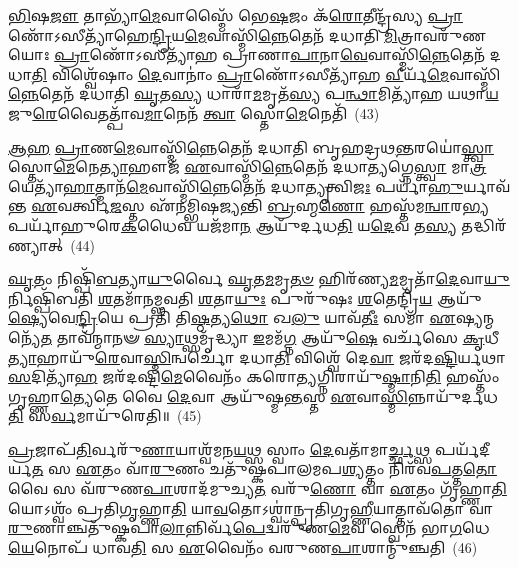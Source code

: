 \-\ul{𑌭𑌿}\-𑌷\-\ul{𑌜𑍗} 𑌤𑌾𑌭𑍍𑌯𑌾᳴\-\ul{𑌮𑍇}\-𑌵𑌾𑌸𑍍𑌮𑍈᳴ 𑌭𑍇\-\ul{𑌷}\-𑌜𑌂 𑌕᳴\-\ul{𑌰𑍋}\-𑌤𑍀𑌨𑍍𑌦𑍍𑌰᳴𑌸𑍍𑌯 \ul{𑌪𑍍𑌰𑌾}\-𑌣𑍋᳴\-𑌽𑌸𑍀𑌤𑍍𑌯𑌾᳴𑌹𑍇\-\ul{𑌨𑍍𑌦𑍍𑌰𑌿}\-𑌯\-\ul{𑌮𑍇}\-𑌵𑌾𑌸𑍍𑌮𑌿᳴\-\ul{𑌨𑍍𑌨𑍇}\-𑌤𑍇𑌨᳴ 𑌦𑌧𑌾𑌤𑌿 \ul{𑌮𑌿}\-𑌤𑍍𑌰𑌾𑌵𑌰𑍁᳴𑌣𑌯𑍋𑌃 \ul{𑌪𑍍𑌰𑌾}\-𑌣𑍋᳴\-𑌽𑌸𑍀𑌤𑍍𑌯𑌾᳴𑌹 𑌪𑍍𑌰𑌾𑌣𑌾\-\ul{𑌪𑌾}\-𑌨𑌾\-\ul{𑌵𑍇}\-𑌵𑌾𑌸𑍍𑌮𑌿᳴\-\ul{𑌨𑍍𑌨𑍇}\-𑌤𑍇𑌨᳴ 𑌦𑌧𑌾\-\ul{𑌤𑌿} 𑌵𑌿𑌶𑍍𑌵𑍇᳴𑌷𑌾𑌂 \ul{𑌦𑍇}\-𑌵𑌾𑌨𑌾𑌂॑ \ul{𑌪𑍍𑌰𑌾}\-𑌣𑍋᳴\-𑌽𑌸𑍀𑌤𑍍𑌯𑌾᳴𑌹 \ul{𑌵𑍀}\-𑌰𑍍𑌯᳴\-\ul{𑌮𑍇}\-𑌵𑌾𑌸𑍍𑌮𑌿᳴\-\ul{𑌨𑍍𑌨𑍇}\-𑌤𑍇𑌨᳴ 𑌦𑌧𑌾𑌤𑌿 \ul{𑌘𑍃}\-𑌤\-\ul{𑌸𑍍𑌯} 𑌧𑌾𑌰𑌾᳴\-\ul{𑌮}\-𑌮𑍃𑌤᳴\-\ul{𑌸𑍍𑌯} 𑌪\-\ul{𑌨𑍍𑌥𑌾}\-𑌮𑌿𑌤𑍍𑌯𑌾᳴𑌹 𑌯𑌥𑌾\-\ul{𑌯}\-𑌜𑍁\-\ul{𑌰𑍇}\-𑌵𑍈𑌤𑌤𑍍𑌪𑌾᳴𑌵\-\ul{𑌮𑌾}\-𑌨𑍇𑌨᳴ \ul{𑌤𑍍𑌵𑌾} 𑌸𑍍𑌤𑍋\-\ul{𑌮𑍇}\-𑌨𑍇𑌤𑌿᳴~(43)

\-\ul{𑌆}\-\-\ul{𑌹} \ul{𑌪𑍍𑌰𑌾}\-𑌣\-\ul{𑌮𑍇}\-𑌵𑌾𑌸𑍍𑌮𑌿᳴\-\ul{𑌨𑍍𑌨𑍇}\-𑌤𑍇𑌨᳴ 𑌦𑌧𑌾𑌤𑌿 𑌬𑍃𑌹𑌦𑍍𑌰𑌥\-\ul{𑌨𑍍𑌤}\-𑌰𑌯𑍋॑\-\ul{𑌸𑍍𑌤𑍍𑌵𑌾} 𑌸𑍍𑌤𑍋\-\ul{𑌮𑍇}\-𑌨𑍇\-\ul{𑌤𑍍𑌯𑌾}\-𑌹𑍗𑌜᳴ \ul{𑌏}\-𑌵𑌾𑌸𑍍𑌮𑌿᳴\-\ul{𑌨𑍍𑌨𑍇}\-𑌤𑍇𑌨᳴ 𑌦𑌧𑌾\-\ul{𑌤𑍍𑌯}\-𑌗𑍍𑌨𑍇\-\ul{𑌸𑍍𑌤𑍍𑌵𑌾} 𑌮𑌾\-\ul{𑌤𑍍𑌰}\-𑌯𑍇𑌤𑍍𑌯𑌾᳴\-\ul{𑌹𑌾}\-𑌤𑍍𑌮𑌾𑌨᳴\-\ul{𑌮𑍇}\-𑌵𑌾𑌸𑍍𑌮𑌿᳴\-\ul{𑌨𑍍𑌨𑍇}\-𑌤𑍇𑌨᳴ 𑌦𑌧𑌾\-\ul{𑌤𑍍𑌯𑍃}\-𑌤𑍍𑌵𑌿\-\ul{𑌜𑌃} 𑌪𑌰𑍍𑌯𑌾᳴\-\ul{𑌹𑍁}\-𑌰𑍍𑌯𑌾𑌵᳴𑌨𑍍𑌤 \ul{𑌏}\-𑌵𑌰𑍍𑌤𑍍𑌵𑌿\-\ul{𑌜}\-𑌸𑍍𑌤 𑌏᳴𑌨𑌮𑍍𑌭𑌿𑌷𑌜𑍍𑌯𑌨𑍍𑌤𑌿 \ul{𑌬𑍍𑌰}\-𑌹𑍍𑌮\-\ul{𑌣𑍋} 𑌹𑌸𑍍𑌤᳴𑌮\-\ul{𑌨𑍍𑌵𑌾}\-𑌰\-\ul{𑌭𑍍𑌯} 𑌪𑌰𑍍𑌯𑌾᳴𑌹𑍁𑌰𑍇\-\ul{𑌕}\-𑌧𑍈𑌵 𑌯𑌜᳴𑌮𑌾\-\ul{𑌨} 𑌆𑌯𑍁᳴𑌰𑍍𑌦𑌧\-\ul{𑌤𑌿} 𑌯\-\ul{𑌦𑍇}\-𑌵 𑌤\-\ul{𑌸𑍍𑌯} 𑌤𑌦𑍍𑌧𑌿𑌰᳴𑌣𑍍𑌯𑌾𑌤𑍍~(44)

\-\ul{𑌘𑍃}\-𑌤𑌂 𑌨𑌿𑌷𑍍𑌪𑌿᳴\-\ul{𑌬}\-𑌤𑍍𑌯𑌾\-\ul{𑌯𑍁}\-𑌰𑍍𑌵𑍈 \ul{𑌘𑍃}\-𑌤\-\ul{𑌮}\-𑌮𑍃\-\ul{𑌤}\-\-\ul{𑍞} 𑌹𑌿𑌰᳴𑌣𑍍𑌯\-\ul{𑌮}\-𑌮𑍃𑌤𑌾᳴\-\ul{𑌦𑍇}\-𑌵𑌾\-\ul{𑌯𑍁}\-𑌰𑍍𑌨𑌿𑌷𑍍𑌪𑌿᳴𑌬𑌤𑌿 \ul{𑌶}\-𑌤𑌮𑌾᳴𑌨𑌮𑍍𑌭𑌵𑌤𑌿 \ul{𑌶}\-𑌤𑌾\-\ul{𑌯𑍁𑌃} 𑌪𑍁𑌰𑍁᳴𑌷𑌃 \ul{𑌶}\-𑌤𑍇𑌨𑍍𑌦𑍍𑌰𑌿᳴\-\ul{𑌯} 𑌆𑌯𑍁᳴\-\ul{𑌷𑍍𑌯𑍇}\-𑌵𑍇\-\ul{𑌨𑍍𑌦𑍍𑌰𑌿}\-𑌯𑍇 𑌪𑍍𑌰𑌤𑌿᳴ 𑌤𑌿\-\ul{𑌷𑍍𑌠}\-𑌤𑍍𑌯\-\ul{𑌥𑍋} 𑌖\-\ul{𑌲𑍁} 𑌯𑌾𑌵᳴\-\ul{𑌤𑍀𑌃} 𑌸𑌮𑌾᳴ \ul{𑌏}\-𑌷𑍍𑌯𑌨𑍍𑌮𑌨𑍍𑌯𑍇᳴\-\ul{𑌤} 𑌤𑌾𑌵᳴𑌨𑍍𑌮𑌾𑌨𑍟 \ul{𑌸𑍍𑌯𑌾}\-𑌥𑍍𑌸𑌮𑍃᳴𑌦𑍍𑌧𑍍𑌯𑌾 \ul{𑌇}\-𑌮𑌮᳴\-\ul{𑌗𑍍𑌨} 𑌆𑌯𑍁᳴\-\ul{𑌷𑍇} 𑌵𑌰𑍍𑌚᳴𑌸𑍇 \ul{𑌕𑍃}\-𑌧𑍀\-\ul{𑌤𑍍𑌯𑌾}\-𑌹𑌾𑌯𑍁᳴\-\ul{𑌰𑍇}\-𑌵𑌾\-\ul{𑌸𑍍𑌮𑌿}\-𑌨𑍍𑌵𑌰𑍍𑌚𑍋᳴ 𑌦𑌧𑌾\-\ul{𑌤𑌿} 𑌵𑌿𑌶𑍍𑌵𑍇᳴ 𑌦𑍇\-\ul{𑌵𑌾} 𑌜𑌰᳴𑌦\-\ul{𑌷𑍍𑌟𑌿}\-𑌰𑍍𑌯𑌥𑌾\-\ul{𑌸}\-𑌦𑌿𑌤𑍍𑌯𑌾᳴\-\ul{𑌹} 𑌜𑌰᳴𑌦𑌷𑍍𑌟𑌿\-\ul{𑌮𑍇}\-𑌵𑍈𑌨𑌂᳴ 𑌕𑌰𑍋\-\ul{𑌤𑍍𑌯}\-𑌗𑍍𑌨𑌿𑌰𑌾𑌯𑍁᳴\-\ul{𑌷𑍍𑌮𑌾}\-𑌨𑌿\-\ul{𑌤𑌿} 𑌹𑌸𑍍𑌤𑌂᳴ 𑌗𑍃𑌹𑍍𑌣𑌾\-\ul{𑌤𑍍𑌯𑍇}\-𑌤𑍇 𑌵𑍈 \ul{𑌦𑍇}\-𑌵𑌾 𑌆𑌯𑍁᳴𑌷𑍍𑌮\-\ul{𑌨𑍍𑌤}\-𑌸𑍍𑌤 \ul{𑌏}\-𑌵𑌾\-\ul{𑌸𑍍𑌮𑌿}\-𑌨𑍍𑌨𑌾𑌯𑍁᳴𑌰𑍍𑌦𑌧\-\ul{𑌤𑌿} 𑌸\-\ul{𑌰𑍍𑌵}\-𑌮𑌾𑌯𑍁᳴𑌰𑍇𑌤𑌿॥~(45)

{\anuvakamend[{𑌰𑌸𑌂᳴ \ul{𑌦𑍇}\-𑌵𑌾\-\ul{𑌨𑌾}\-\-\ul{𑍟} 𑌸𑍍𑌤𑍋\-\ul{𑌮𑍇}\-𑌨𑍇\-\ul{𑌤𑌿} 𑌹𑌿𑌰᳴\-\ul{𑌣𑍍𑌯𑌾}\-𑌦\-\ul{𑌸}\-𑌦𑌿\-\ul{𑌤𑌿} 𑌦𑍍𑌵𑌾𑌵𑌿𑍞᳴𑌶𑌤𑌿𑌶𑍍𑌚}]}%

\-\ul{𑌪𑍍𑌰}\-𑌜𑌾𑌪᳴\-\ul{𑌤𑌿}\-𑌰𑍍𑌵𑌰𑍁᳴\-\ul{𑌣𑌾}\-𑌯𑌾𑌶𑍍𑌵᳴𑌮𑌨\-\ul{𑌯}\-𑌥𑍍𑌸 𑌸𑍍𑌵𑌾𑌂 \ul{𑌦𑍇}\-𑌵𑌤𑌾᳴𑌮𑌾\-\ul{𑌰𑍍𑌚𑍍𑌛}\-𑌥𑍍𑌸 𑌪𑌰𑍍𑌯᳴𑌦𑍀𑌰𑍍𑌯\-\ul{𑌤} 𑌸 \ul{𑌏}\-𑌤𑌂 𑌵𑌾᳴\-\ul{𑌰𑍁}\-𑌣𑌂 𑌚𑌤𑍁᳴𑌷𑍍𑌕𑌪𑌾𑌲𑌮𑌪\-\ul{𑌶𑍍𑌯}\-𑌤𑍍𑌤𑌂 𑌨𑌿𑌰᳴𑌵\-\ul{𑌪}\-𑌤𑍍𑌤\-\ul{𑌤𑍋} 𑌵𑍈 𑌸 𑌵᳴𑌰𑍁𑌣\-\ul{𑌪𑌾}\-𑌶𑌾𑌦᳴𑌮𑍁𑌚𑍍𑌯\-\ul{𑌤} 𑌵𑌰𑍁᳴\-\ul{𑌣𑍋} 𑌵𑌾 \ul{𑌏}\-𑌤𑌂 𑌗𑍃᳴𑌹𑍍𑌣𑌾\-\ul{𑌤𑌿} 𑌯𑍋\-𑌽𑌶𑍍𑌵𑌂᳴ 𑌪𑍍𑌰𑌤𑌿\-\ul{𑌗𑍃}\-𑌹𑍍𑌣𑌾\-\ul{𑌤𑌿} 𑌯𑌾\-\ul{𑌵}\-𑌤𑍋\-𑌽𑌶𑍍𑌵𑌾॑𑌨𑍍𑌪𑍍𑌰𑌤𑌿𑌗𑍃\-\ul{𑌹𑍍𑌣𑍀}\-𑌯𑌾𑌤𑍍𑌤𑌾𑌵᳴𑌤𑍋 𑌵𑌾\-\ul{𑌰𑍁}\-𑌣𑌾𑌞𑍍𑌚𑌤𑍁᳴𑌷𑍍𑌕𑌪𑌾\-\ul{𑌲𑌾}\-𑌨𑍍𑌨𑌿𑌰𑍍𑌵᳴\-\ul{𑌪𑍇}\-𑌦𑍍𑌵𑌰𑍁᳴𑌣\-\ul{𑌮𑍇}\-𑌵 𑌸𑍍𑌵𑍇𑌨᳴ 𑌭𑌾\-\ul{𑌗}\-𑌧𑍇\-\ul{𑌯𑍇}\-𑌨𑍋𑌪᳴ 𑌧𑌾𑌵\-\ul{𑌤𑌿} 𑌸 \ul{𑌏}\-𑌵𑍈𑌨𑌂᳴ 𑌵𑌰𑍁𑌣\-\ul{𑌪𑌾}\-𑌶𑌾𑌨𑍍𑌮𑍁᳴𑌞𑍍𑌚𑌤𑌿~(46)

